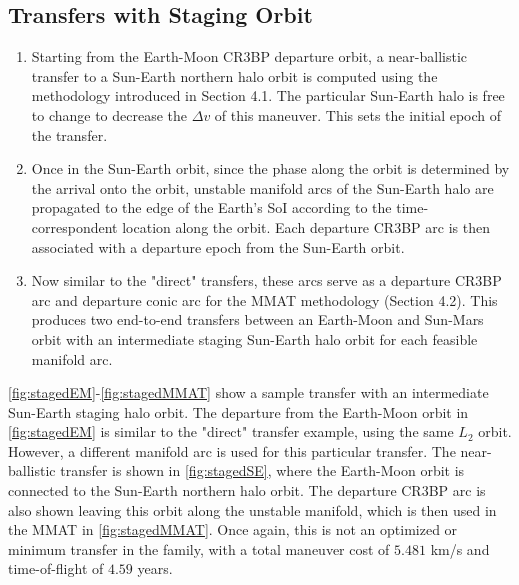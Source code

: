 \subsection{Transfers with Staging Orbit}
\begin{enumerate}
    \item   Starting from the Earth-Moon CR3BP departure orbit, a near-ballistic transfer to a
            Sun-Earth northern halo orbit is computed using the methodology introduced in Section
            4.1. The particular Sun-Earth halo is free to change to decrease the $\Delta v$ of this
            maneuver. This sets the initial epoch of the transfer.
    \item   Once in the Sun-Earth orbit, since the phase along the orbit is determined by the
            arrival onto the orbit, unstable manifold arcs of the Sun-Earth halo are propagated to
            the edge of the Earth's SoI according to the time-correspondent location along the
            orbit. Each departure CR3BP arc is then associated with a departure epoch from the
            Sun-Earth orbit.
    \item   Now similar to the "direct" transfers, these arcs serve as a departure CR3BP arc and
            departure conic arc for the MMAT methodology (Section 4.2). This produces two
            end-to-end transfers between an Earth-Moon and Sun-Mars orbit with an intermediate
            staging Sun-Earth halo orbit for each feasible manifold arc.
\end{enumerate}

\cref{fig:stagedEM}-\cref{fig:stagedMMAT} show a sample transfer with an intermediate Sun-Earth
staging halo orbit. The departure from the Earth-Moon orbit in \cref{fig:stagedEM} is similar to
the "direct" transfer example, using the same $L_{2}$ orbit. However, a different manifold arc is
used for this particular transfer. The near-ballistic transfer is shown in \cref{fig:stagedSE},
where the Earth-Moon orbit is connected to the Sun-Earth northern halo orbit. The departure CR3BP
arc is also shown leaving this orbit along the unstable manifold, which is then used in the MMAT in
\cref{fig:stagedMMAT}. Once again, this is not an optimized or minimum transfer in the family, with
a total maneuver cost of $5.481$ km/s and time-of-flight of $4.59$ years.


